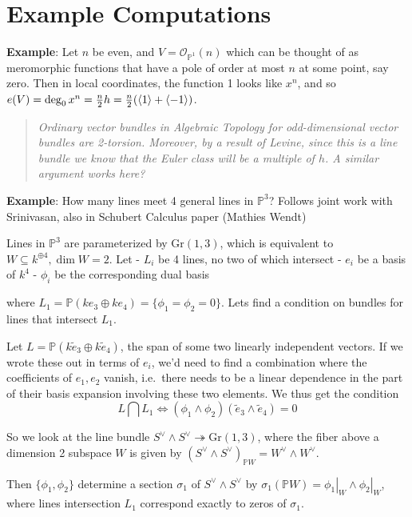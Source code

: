 \documentclass[11pt]{scrreprt}
\theoremstyle{definition}
\newcommand{\PP}[0]{{\mathbb{P}}}
\newcommand{\Gr}[0]{{\text{Gr}}}
\newcommand{\OO}[0]{{\mathcal{O}}}
\newcommand{\dual}[0]{\vee}
\newcommand{\generators}[1]{\langle{#1}\rangle}
\newcommand{\theset}[1]{\{{#1}\}}
\newcommand{\restrictionof}[2]{{\left.{#1}\right|_{#2}}}
\newcommand{\intersect}[0]{\bigcap}
\newcommand{\covers}[0]{\twoheadrightarrow}
\begin{document}
\hypertarget{example-computations}{%
\section{Example Computations}\label{example-computations}}

\textbf{Example}: Let \(n\) be even, and \(V = \OO_{\PP^1}(n)\) which
can be thought of as meromorphic functions that have a pole of order at
most \(n\) at some point, say zero. Then in local coordinates, the
function 1 looks like \(x^n\), and so
\(e(V) = \deg_0 x^n = {n\over 2} h = {n\over 2}(\generators{1} + \generators{-1})\).

\begin{quote}\textit{
Ordinary vector bundles in Algebraic Topology for odd-dimensional vector
bundles are 2-torsion. Moreover, by a result of Levine, since this is a
line bundle we know that the Euler class will be a multiple of \(h\). A
similar argument works here?
}\end{quote}

\textbf{Example}: How many lines meet 4 general lines in \(\PP^3\)?
Follows joint work with Srinivasan, also in Schubert Calculus paper
(Mathies Wendt)

Lines in \(\PP^3\) are parameterized by \(\Gr(1,3)\), which is
equivalent to \(W \subseteq k^{\oplus 4}, \dim W = 2\). Let - \(L_i\) be
4 lines, no two of which intersect - \(e_i\) be a basis of \(k^4\) -
\(\phi_i\) be the corresponding dual basis

where \(L_1 = \PP(ke_3\oplus ke_4) = \theset{\phi_1=\phi_2 = 0}\). Lets
find a condition on bundles for lines that intersect \(L_1\).

Let \(L= \PP(k\tilde e_3 \oplus k\tilde e_4)\), the span of some two
linearly independent vectors. If we wrote these out in terms of \(e_i\),
we'd need to find a combination where the coefficients of \(e_1, e_2\)
vanish, i.e.~there needs to be a linear dependence in the part of their
basis expansion involving these two elements. We thus get the condition
\[
L\intersect L_1 \iff (\phi_1 \wedge \phi_2)(\tilde e_3 \wedge \tilde e_4) = 0
\]

So we look at the line bundle
\(S^\dual \wedge S^\dual \covers \Gr(1,3)\), where the fiber above a
dimension 2 subspace \(W\) is given by
\((S^\dual \wedge S^\dual)_{\PP W} = W^\dual \wedge W^\dual\).

Then \(\theset{\phi_1, \phi_2}\) determine a section \(\sigma_1\) of
\(S^\dual \wedge S^\dual\) by
\(\sigma_1(\PP W) = \restrictionof{\phi_1}{W} \wedge \restrictionof{\phi_2}{W}\),
where lines intersection \(L_1\) correspond exactly to zeros of
\(\sigma_1\).
\end{document}

